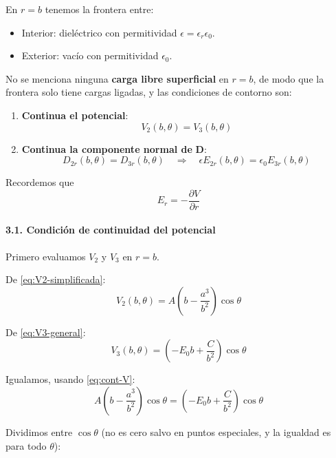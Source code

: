 \documentclass{article}
\begin{document}
En $r=b$ tenemos la frontera entre:

\begin{itemize}
  \item Interior: dieléctrico con permitividad $\epsilon = \epsilon_{r}\epsilon_{0}$.
  \item Exterior: vacío con permitividad $\epsilon_{0}$.
\end{itemize}

No se menciona ninguna \textbf{carga libre superficial} en $r=b$, de modo que la frontera solo tiene cargas ligadas, y las condiciones de contorno son:

\begin{enumerate}
  \item \textbf{Continua el potencial}:
    \begin{equation}
      V_{2}(b,\theta) = V_{3}(b,\theta)
      \label{eq:cont-V}
    \end{equation}
  \item \textbf{Continua la componente normal de} $\mathbf{D}$:
    \begin{equation}
      D_{2r}(b,\theta) = D_{3r}(b,\theta)
      \quad\Longrightarrow\quad
      \epsilon E_{2r}(b,\theta) = \epsilon_{0} E_{3r}(b,\theta)
      \label{eq:cont-D}
    \end{equation}
\end{enumerate}

Recordemos que
\[
E_{r} = -\frac{\partial V}{\partial r}
\]

\paragraph{3.1. Condición de continuidad del potencial}

Primero evaluamos $V_{2}$ y $V_{3}$ en $r=b$.

De \eqref{eq:V2-simplificada}:
\[
V_{2}(b,\theta) = A\left(b - \frac{a^{3}}{b^{2}}\right)\cos\theta
\]

De \eqref{eq:V3-general}:
\[
V_{3}(b,\theta) = \left(-E_{0} b + \frac{C}{b^{2}}\right)\cos\theta
\]

Igualamos, usando \eqref{eq:cont-V}:
\begin{equation}
A\left(b - \frac{a^{3}}{b^{2}}\right)\cos\theta
= \left(-E_{0} b + \frac{C}{b^{2}}\right)\cos\theta
\label{eq:cont-V-cos}
\end{equation}

Dividimos entre $\cos\theta$ (no es cero salvo en puntos especiales, y la igualdad es para todo $\theta$):
\end{document}
